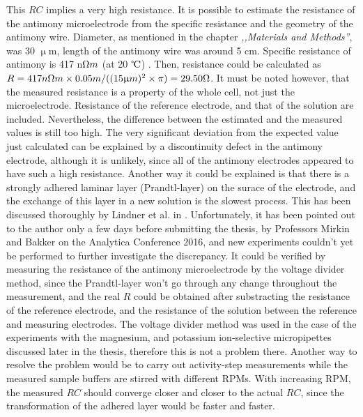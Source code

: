 This $RC$ implies a very high resistance.
It is possible to estimate the resistance of the antimony microelectrode from the specific resistance and the geometry of the antimony wire.
Diameter, as mentioned in the chapter \emph{,,Materials and Methods''}, was 30 $\upmu$m, length of the antimony wire was around 5 cm.
Specific resistance of antimony is 417 n$\ohm m$ (at 20 $\celsius$) \cite{lide2001crc}.
Then, resistance could be calculated as $R = 417 n\ohm m \times 0.05 m / ((15 \upmu m)^2 \times \pi) = 29.50 \ohm$.
It must be noted however, that the measured resistance is a property of the whole cell, not just the microelectrode.
Resistance of the reference electrode, and that of the solution are included.
Nevertheless, the difference between the estimated and the measured values is still too high.
The very significant deviation from the expected value just calculated can be explained by a discontinuity defect in the antimony electrode, although it is unlikely, since all of the antimony electrodes appeared to have such a high resistance.
Another way it could be explained is that there is a strongly adhered laminar layer (Prandtl-layer) on the surace of the electrode, and the exchange of this layer in a new solution is the slowest process.
This has been discussed thoroughly by Lindner et al. in \cite{lindner1976response}.
Unfortunately, it has been pointed out to the author only a few days before submitting the thesis, by Professors Mirkin and Bakker on the Analytica Conference 2016, and new experiments couldn't yet be performed to further investigate the discrepancy.
It could be verified by measuring the resistance of the antimony microelectrode by the voltage divider method, since the Prandtl-layer won't go through any change throughout the measurement, and the real $R$ could be obtained after substracting the resistance of the reference electrode, and the resistance of the solution between the reference and measuring electrodes.
The voltage divider method was used in the case of the experiments with the magnesium, and potassium ion-selective micropipettes discussed later in the thesis, therefore this is not a problem there.
Another way to resolve the problem would be to carry out activity-step measurements while the measured sample buffers are stirred with different RPMs.
With increasing RPM, the measured $RC$ should converge closer and closer to the actual $RC$, since the transformation of the adhered layer would be faster and faster.

